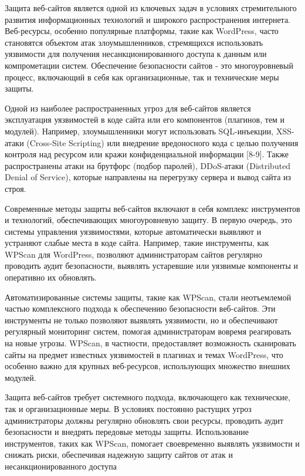 \documentclass[
]{article}
\begin{document}
Защита веб-сайтов является одной из ключевых задач в условиях
стремительного развития информационных технологий и широкого
распространения интернета. Веб-ресурсы, особенно популярные платформы,
такие как WordPress, часто становятся объектом атак злоумышленников,
стремящихся использовать уязвимости для получения несанкционированного
доступа к данным или компрометации систем. Обеспечение безопасности
сайтов - это многоуровневый процесс, включающий в себя как
организационные, так и технические меры защиты.

Одной из наиболее распространенных угроз для веб-сайтов является
эксплуатация уязвимостей в коде сайта или его компонентов (плагинов, тем
и модулей). Например, злоумышленники могут использовать SQL-инъекции,
XSS-атаки (Cross-Site Scripting) или внедрение вредоносного кода с целью
получения контроля над ресурсом или кражи конфиденциальной информации
{[}8-9{]}. Также распространены атаки на брутфорс (подбор паролей),
DDoS-атаки (Distributed Denial of Service), которые направлены на
перегрузку сервера и вывод сайта из строя.

Современные методы защиты веб-сайтов включают в себя комплекс
инструментов и технологий, обеспечивающих многоуровневую защиту. В
первую очередь, это системы управления уязвимостями, которые
автоматически выявляют и устраняют слабые места в коде сайта. Например,
такие инструменты, как WPScan для WordPress, позволяют администраторам
сайтов регулярно проводить аудит безопасности, выявлять устаревшие или
уязвимые компоненты и оперативно их обновлять.

Автоматизированные системы защиты, такие как WPScan, стали неотъемлемой
частью комплексного подхода к обеспечению безопасности веб-сайтов. Эти
инструменты не только позволяют выявлять уязвимости, но и обеспечивают
регулярный мониторинг систем, помогая администраторам вовремя
реагировать на новые угрозы. WPScan, в частности, предоставляет
возможность сканировать сайты на предмет известных уязвимостей в
плагинах и темах WordPress, что особенно важно для крупных веб-ресурсов,
использующих множество внешних модулей.

Защита веб-сайтов требует системного подхода, включающего как
технические, так и организационные меры. В условиях постоянно растущих
угроз администраторы должны регулярно обновлять свои ресурсы, проводить
аудит безопасности и внедрять передовые методы защиты. Использование
инструментов, таких как WPScan, помогает своевременно выявлять
уязвимости и снижать риски, обеспечивая надежную защиту сайтов от атак и
несанкционированного доступа
\end{document}
